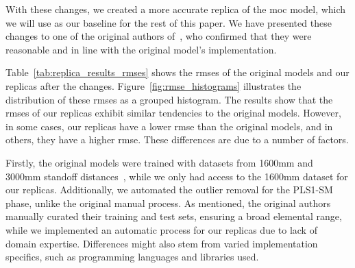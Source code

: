 With these changes, we created a more accurate replica of the \gls{moc} model, which we will use as our baseline for the rest of this paper.
We have presented these changes to one of the original authors of~\citet{cleggRecalibrationMarsScience2017}, who confirmed that they were reasonable and in line with the original model's implementation.

Table~\ref{tab:replica_results_rmses} shows the \gls{rmse}s of the original models and our replicas after the changes.
Figure~\ref{fig:rmse_histograms} illustrates the distribution of these \gls{rmse}s as a grouped histogram.
The results show that the \gls{rmse}s of our replicas exhibit similar tendencies to the original models.
However, in some cases, our replicas have a lower \gls{rmse} than the original models, and in others, they have a higher \gls{rmse}.
These differences are due to a number of factors.

Firstly, the original models were trained with datasets from 1600mm and 3000mm standoff distances~\cite{cleggRecalibrationMarsScience2017}, while we only had access to the 1600mm dataset for our replicas.
Additionally, we automated the outlier removal for the PLS1-SM phase, unlike the original manual process.
As mentioned, the original authors manually curated their training and test sets, ensuring a broad elemental range, while we implemented an automatic process for our replicas due to lack of domain expertise.
Differences might also stem from varied implementation specifics, such as programming languages and libraries used.

